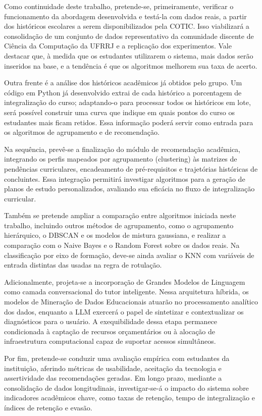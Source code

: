 Como continuidade deste trabalho, pretende-se, primeiramente, verificar o funcionamento da abordagem desenvolvida e testá-la com dados reais, a partir dos históricos escolares a serem disponibilizados pela COTIC. Isso viabilizará a consolidação de um conjunto de dados representativo da comunidade discente de Ciência da Computação da UFRRJ e a replicação dos experimentos. Vale destacar que, à medida que os estudantes utilizarem o sistema, mais dados serão inseridos na base, e a tendência é que os algoritmos melhorem sua taxa de acerto.

Outra frente é a análise dos históricos acadêmicos já obtidos pelo grupo. Um código em Python já desenvolvido extrai de cada histórico a porcentagem de integralização do curso; adaptando-o para processar todos os históricos em lote, será possível construir uma curva que indique em quais pontos do curso os estudantes mais ficam retidos. Essa informação poderá servir como entrada para os algoritmos de agrupamento e de recomendação.

Na sequência, prevê-se a finalização do módulo de recomendação acadêmica, integrando os perfis mapeados por agrupamento (clustering) às matrizes de pendências curriculares, encadeamento de pré-requisitos e trajetórias históricas de concluintes. Essa integração permitirá investigar algoritmos para a geração de planos de estudo personalizados, avaliando sua eficácia no fluxo de integralização curricular.

Também se pretende ampliar a comparação entre algoritmos iniciada neste trabalho, incluindo outros métodos de agrupamento, como o agrupamento hierárquico, o DBSCAN e os modelos de mistura gaussiana, e realizar a comparação com o Naive Bayes e o Random Forest \citep{nachouki2023randomforest} sobre os dados reais. Na classificação por eixo de formação, deve-se ainda avaliar o KNN com variáveis de entrada distintas das usadas na regra de rotulação.

Adicionalmente, projeta-se a incorporação de Grandes Modelos de Linguagem como camada conversacional do tutor inteligente. Nessa arquitetura híbrida, os modelos de Mineração de Dados Educacionais atuarão no processamento analítico dos dados, enquanto a LLM exercerá o papel de sintetizar e contextualizar os diagnósticos para o usuário. A exequibilidade dessa etapa permanece condicionada à captação de recursos orçamentários ou à alocação de infraestrutura computacional capaz de suportar acessos simultâneos.

Por fim, pretende-se conduzir uma avaliação empírica com estudantes da instituição, aferindo métricas de usabilidade, aceitação da tecnologia e assertividade das recomendações geradas. Em longo prazo, mediante a consolidação de dados longitudinais, investigar-se-á o impacto do sistema sobre indicadores acadêmicos chave, como taxas de retenção, tempo de integralização e índices de retenção e evasão.